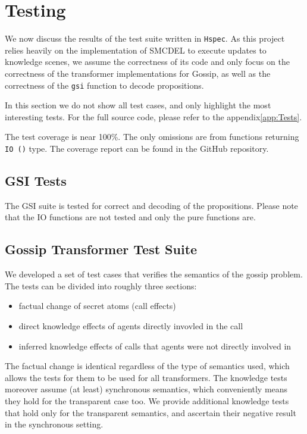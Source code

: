 \section{Testing}\label{sec:Testing}
We now discuss the results of the test suite written in \texttt{Hspec}.
As this project relies heavily on the implementation of SMCDEL to execute updates to knowledge scenes,
we assume the correctness of its code and only focus on the correctness of the transformer implementations for Gossip,
as well as the correctness of the \texttt{gsi} function to decode propositions.

In this section we do not show all test cases, and only highlight the most interesting tests. For the full source code, please
refer to the appendix\ref{app:Tests}.

The test coverage is near 100\%. The only omissions are from functions returning \texttt{IO ()} type.
The coverage report can be found in the GitHub repository.

\subsection{GSI Tests}
The GSI suite is tested for correct and decoding of the propositions.
Please note that the IO functions are not tested and only the pure functions are.

\subsection{Gossip Transformer Test Suite}
We developed a set of test cases that verifies the semantics of the gossip problem.
The tests can be divided into roughly three sections:
\begin{itemize}
    \item factual change of secret atoms (call effects)
    \item direct knowledge effects of agents directly invovled in the call
    \item inferred knowledge effects of calls that agents were not directly involved in
\end{itemize}

The factual change is identical regardless of the type of semantics used, which allows the tests for them to be used for all transformers.
The knowledge tests moreover assume (at least) synchronous semantics, which conveniently means they hold for the transparent case too.
We provide additional knowledge tests that hold only for the transparent semantics, and ascertain their negative result in the synchronous setting.

